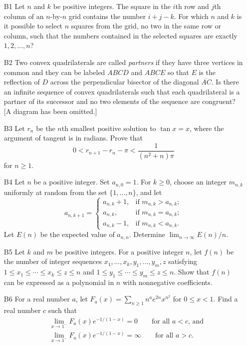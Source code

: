 \documentclass[amssymb,twocolumn,pra,10pt,aps,nofootinbib]{revtex4-1}
\begin{document}
\begin{itemize}
\item[B1]
Let $n$ and $k$ be positive integers. The square in the $i$th row and $j$th column of an $n$-by-$n$ grid contains the number $i+j-k$. For which $n$ and $k$ is it possible to select $n$ squares from the grid, no two in the same row or column, such that the numbers contained in the selected squares are exactly $1,2,\dots,n$?

\item[B2]
Two convex quadrilaterals are called \emph{partners} if they have three vertices in common and they can be labeled $ABCD$ and $ABCE$ so that $E$ is the reflection of $D$ across the perpendicular bisector of the diagonal $\overline{AC}$. Is there an infinite sequence of convex quadrilaterals such that each quadrilateral is a partner of its successor and no two elements of the sequence are congruent?
[A diagram has been omitted.]

\item[B3]
Let $r_n$ be the $n$th smallest positive solution to $\tan x = x$, where the argument of tangent is in radians. Prove that
\[
0 < r_{n+1} - r_n - \pi < \frac{1}{(n^2+n)\pi}
\]
for $n \geq 1$.

\item[B4]
Let $n$ be a positive integer. Set $a_{n,0} = 1$. For $k \geq 0$, choose an integer $m_{n,k}$ uniformly at random from the set $\{1,\dots,n\}$, and let
\[
a_{n,k+1} = \begin{cases} a_{n,k} + 1, & \mbox{if $m_{n,k} > a_{n,k};$} \\
a_{n,k}, & \mbox{if $m_{n,k} = a_{n,k}$;} \\
a_{n,k}-1, & \mbox{if $m_{n,k} < a_{n,k}$.}
\end{cases}
\]
Let $E(n)$ be the expected value of $a_{n,n}$. Determine $\lim_{n\to \infty} E(n)/n$.

\item[B5]
Let $k$ and $m$ be positive integers. For a positive integer $n$, let $f(n)$ be the number of integer sequences $x_1,\dots,x_k,y_1,\dots,y_m,z$ satisfying $1 \leq x_1 \leq \cdots \leq x_k \leq z \leq n$ and $1 \leq y_1 \leq \cdots \leq y_m \leq z \leq n$. Show that $f(n)$ can be expressed as a polynomial in $n$ with nonnegative coefficients.

\item[B6]
For a real number $a$, let $F_a(x) = \sum_{n \geq 1} n^a e^{2n} x^{n^2}$ for $0 \leq x < 1$.
Find a real number $c$ such that
\begin{align*}
& \lim_{x \to 1^-} F_a(x) e^{-1/(1-x)} = 0 \qquad \mbox{for all $a < c$, and} \\
& \lim_{x \to 1^-} F_a(x) e^{-1/(1-x)} = \infty \qquad \mbox{for all $a > c$.}
\end{align*}

\end{itemize}
\end{document}
